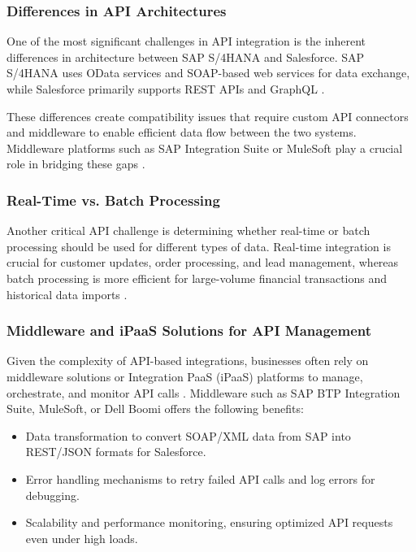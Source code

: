 \subsubsection{Differences in API Architectures}
One of the most significant challenges in API integration is the inherent differences in architecture between SAP S/4HANA and Salesforce. SAP S/4HANA uses OData services and SOAP-based web services for data exchange, while Salesforce primarily supports REST APIs and GraphQL \cite{chinta2024}.

These differences create compatibility issues that require custom API connectors and middleware to enable efficient data flow between the two systems. Middleware platforms such as SAP Integration Suite or MuleSoft play a crucial role in bridging these gaps \cite{chinta2024}.

\subsubsection{Real-Time vs. Batch Processing}
Another critical API challenge is determining whether real-time or batch processing should be used for different types of data. Real-time integration is crucial for customer updates, order processing, and lead management, whereas batch processing is more efficient for large-volume financial transactions and historical data imports \cite{almudimigh2009}.

\subsubsection{Middleware and iPaaS Solutions for API Management}
Given the complexity of API-based integrations, businesses often rely on middleware solutions or Integration PaaS (iPaaS) platforms to manage, orchestrate, and monitor API calls \cite{chinta2024}. Middleware such as SAP BTP Integration Suite, MuleSoft, or Dell Boomi offers the following benefits:
\begin{itemize}
    \item Data transformation to convert SOAP/XML data from SAP into REST/JSON formats for Salesforce.
    \item Error handling mechanisms to retry failed API calls and log errors for debugging.
    \item Scalability and performance monitoring, ensuring optimized API requests even under high loads.
\end{itemize}

